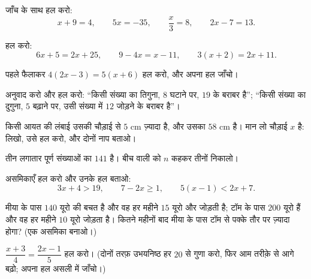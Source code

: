 \begin{exercise}[$\star$]\label{exo:g8:equations:4}
जाँच के साथ हल करो:
\[
x + 9 = 4, \qquad
5x = -35, \qquad
\frac{x}{3} = 8, \qquad
2x - 7 = 13 .
\]
\end{exercise}

\begin{exercise}[$\star$]\label{exo:g8:equations:5}
हल करो:
\[
6x + 5 = 2x + 25, \qquad
9 - 4x = x - 11, \qquad
3(x + 2) = 2x + 11 .
\]
\end{exercise}

\begin{exercise}[$\star$]\label{exo:g8:equations:6}
पहले फैलाकर $4(2x - 3) = 5(x + 6)$ हल करो, और अपना हल जाँचो।
\end{exercise}

\begin{exercise}[$\star$]\label{exo:g8:equations:7}
अनुवाद करो और हल करो: ``किसी संख्या का तिगुना, $8$ घटाने पर, $19$
के बराबर है''; ``किसी संख्या का दुगुना, $5$ बढ़ाने पर, उसी संख्या
में $12$ जोड़ने के बराबर है''।
\end{exercise}

\begin{exercise}[$\star\star$]\label{exo:g8:equations:8}
किसी आयत की लंबाई उसकी चौड़ाई से $5$ cm ज़्यादा है, और उसका 
$58$ cm है। मान लो चौड़ाई $x$ है:  लिखो, उसे हल करो, और दोनों
नाप बताओ।
\end{exercise}

\begin{exercise}[$\star\star$]\label{exo:g8:equations:9}
तीन लगातार पूर्ण संख्याओं का  $141$ है। बीच वाली को $n$
कहकर तीनों निकालो।
\end{exercise}

\begin{exercise}[$\star\star$]\label{exo:g8:equations:10}
असमिकाएँ हल करो और उनके हल बताओ:
\[
3x + 4 > 19, \qquad
7 - 2x \geq 1, \qquad
5(x - 1) < 2x + 7 .
\]
\end{exercise}

\begin{exercise}[$\star\star$]\label{exo:g8:equations:11}
मीया के पास $140$ यूरो की बचत है और वह हर महीने $15$ यूरो और
जोड़ती है; टॉम के पास $200$ यूरो हैं और वह हर महीने $10$ यूरो
जोड़ता है। कितने महीनों बाद मीया के पास टॉम से पक्के तौर पर
ज़्यादा होगा? (एक असमिका बनाओ।)
\end{exercise}

\begin{exercise}[$\star\star\star$]\label{exo:g8:equations:12}
 $\dfrac{x + 3}{4} = \dfrac{2x - 1}{5}$ हल करो।
(दोनों तरफ़ उभयनिष्ठ हर $20$ से गुणा करो, फिर आम तरीक़े से आगे बढ़ो;
अपना हल असली  में जाँचो।)
\end{exercise}

